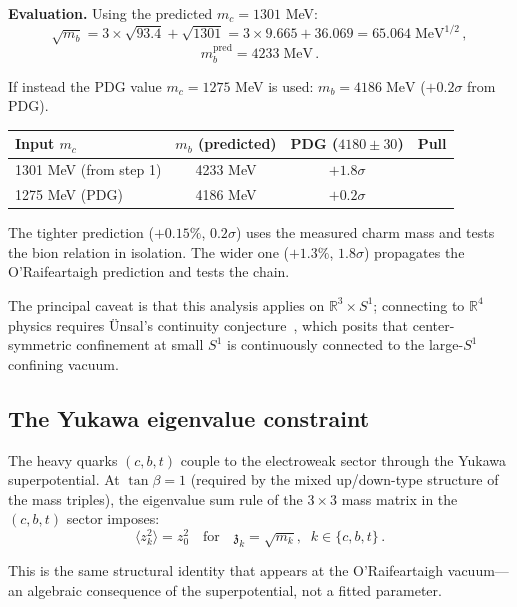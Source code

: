\documentclass[12pt,a4paper]{article}
\newcommand{\zch}{\mathfrak{z}}
\begin{document}
\textbf{Evaluation.} Using the predicted $m_c = 1301$ MeV:
\begin{equation}
\sqrt{m_b}
= 3 \times \sqrt{93.4} + \sqrt{1301}
= 3 \times 9.665 + 36.069
= 65.064\;\mathrm{MeV}^{1/2}\,,
\end{equation}
\begin{equation}
m_b^{\mathrm{pred}} = 4233\;\mathrm{MeV}\,.
\end{equation}

If instead the PDG value $m_c = 1275$ MeV is used:
$m_b = 4186\;\mathrm{MeV}$ ($+0.2\sigma$ from PDG).

\begin{center}
\begin{tabular}{lccc}
\toprule
Input $m_c$ & $m_b$ (predicted) & PDG ($4180 \pm 30$) & Pull \\
\midrule
1301 MeV (from step 1) & 4233 MeV & $+1.8\sigma$ & \\
1275 MeV (PDG) & 4186 MeV & $+0.2\sigma$ & \\
\bottomrule
\end{tabular}
\end{center}

The tighter prediction ($+0.15\%$, $0.2\sigma$) uses the measured
charm mass and tests the bion relation in isolation. The wider one
($+1.3\%$, $1.8\sigma$) propagates the O'Raifeartaigh prediction
and tests the chain.

The principal caveat is that this analysis
applies on $\mathbb{R}^3 \times S^1$; connecting to $\mathbb{R}^4$
physics requires \"Unsal's continuity conjecture~\cite{Unsal2012},
which posits that center-symmetric confinement at small $S^1$ is
continuously connected to the large-$S^1$ confining vacuum.

\subsection{The Yukawa eigenvalue constraint}

The heavy quarks $(c, b, t)$ couple to the electroweak sector through
the Yukawa superpotential. At $\tan\beta = 1$ (required by the mixed
up/down-type structure of the mass triples), the eigenvalue sum rule of
the $3 \times 3$ mass matrix in the $(c, b, t)$ sector imposes:
\begin{equation}
\boxed{\langle z_k^2 \rangle = z_0^2
\quad\text{for}\quad
\zch_k = \sqrt{m_k},\;\; k \in \{c, b, t\}\,.}
\end{equation}

This is the same structural identity that appears at the
O'Raifeartaigh vacuum---an algebraic consequence of the
superpotential, not a fitted parameter.
\end{document}
